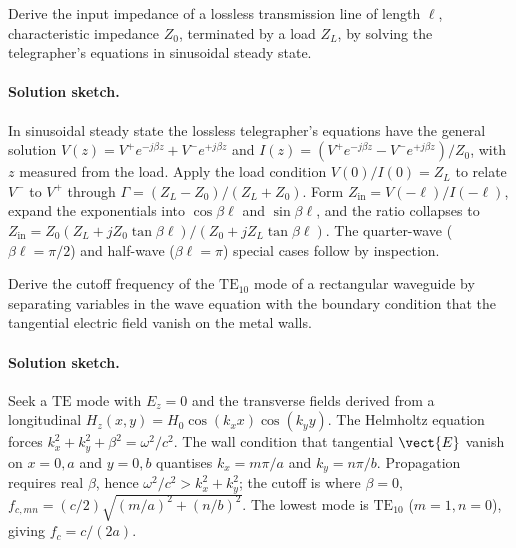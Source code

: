 \begin{exercise}
Derive the input impedance of a lossless transmission line of length
$\ell$, characteristic impedance $Z_{0}$, terminated by a load $Z_{L}$,
by solving the telegrapher's equations in sinusoidal steady state.
\paragraph{Solution sketch.} In sinusoidal steady state the lossless
telegrapher's equations have the general solution $V(z) = V^{+}
e^{-j\beta z} + V^{-}e^{+j\beta z}$ and $I(z) = (V^{+}e^{-j\beta z} -
V^{-}e^{+j\beta z})/Z_{0}$, with $z$ measured from the load. Apply the
load condition $V(0)/I(0) = Z_{L}$ to relate $V^{-}$ to $V^{+}$ through
$\Gamma = (Z_{L}-Z_{0})/(Z_{L}+Z_{0})$. Form $Z_{\text{in}} =
V(-\ell)/I(-\ell)$, expand the exponentials into $\cos\beta\ell$ and
$\sin\beta\ell$, and the ratio collapses to $Z_{\text{in}} = Z_{0}
(Z_{L} + jZ_{0}\tan\beta\ell)/(Z_{0} + jZ_{L}\tan\beta\ell)$. The
quarter-wave ($\beta\ell = \pi/2$) and half-wave ($\beta\ell = \pi$)
special cases follow by inspection.
\end{exercise}

\begin{exercise}
Derive the cutoff frequency of the $\text{TE}_{10}$ mode of a
rectangular waveguide by separating variables in the wave equation
with the boundary condition that the tangential electric field
vanish on the metal walls.
\paragraph{Solution sketch.} Seek a $\text{TE}$ mode with $E_{z} = 0$
and the transverse fields derived from a longitudinal $H_{z}(x,y) =
H_{0}\cos(k_{x}x)\cos(k_{y}y)$. The Helmholtz equation forces $k_{x}^{2}
+ k_{y}^{2} + \beta^{2} = \omega^{2}/c^{2}$. The wall condition that
tangential $\vect{E}$ vanish on $x = 0, a$ and $y = 0, b$ quantises
$k_{x} = m\pi/a$ and $k_{y} = n\pi/b$. Propagation requires real
$\beta$, hence $\omega^{2}/c^{2} > k_{x}^{2} + k_{y}^{2}$; the cutoff is
where $\beta = 0$, $f_{c,mn} = (c/2)\sqrt{(m/a)^{2} + (n/b)^{2}}$. The
lowest mode is $\text{TE}_{10}$ ($m=1, n=0$), giving $f_{c} = c/(2a)$.
\end{exercise}

